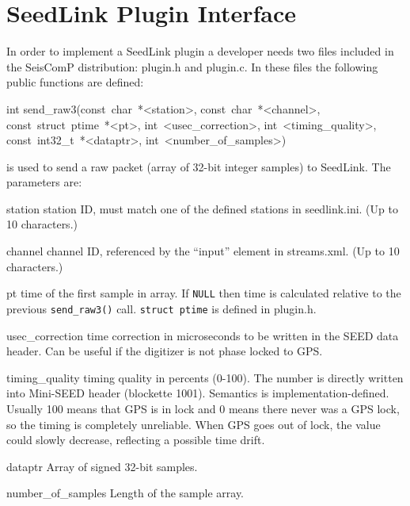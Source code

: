 \documentclass[11pt,a4paper,titlepage]{article}
\begin{document}
\section{SeedLink Plugin Interface}\label{plugins}

\let\stditem\item

In order to implement a SeedLink plugin a developer needs two files
included in the SeisComP distribution: plugin.h and plugin.c. In these
files the following public functions are defined:
\begin{interface}
\item int send_raw3(const~char~*<station>, const~char~*<channel>,
            const~struct~ptime~*<pt>, int~<usec_correction>,
            int~<timing_quality>, const~int32_t~*<dataptr>,
            int~<number_of_samples>)

is used to send a raw packet (array of 32-bit integer samples) to SeedLink.
The parameters are:
\begin{parameters}

\item[station] station ID, must match one of the defined stations in
seedlink.ini. (Up to 10 characters.)

\item[channel] channel ID, referenced by the ``input'' element in
streams.xml. (Up to 10 characters.)

\item[pt] time of the first sample in array. If \verb+NULL+ then time is
calculated relative to the previous \verb+send_raw3()+ call.
\verb+struct ptime+ is defined in plugin.h.

\item[usec_correction] time correction in microseconds to be written in the
SEED data header. Can be useful if the digitizer is not phase locked to
GPS.

\item[timing_quality] timing quality in percents (0-100). The number is
directly written into Mini-SEED header (blockette 1001). Semantics is
implementation-defined. Usually 100 means that GPS is in lock and 0 means
there never was a GPS lock, so the timing is completely unreliable. When
GPS goes out of lock, the value could slowly decrease, reflecting a
possible time drift.

\item[dataptr] Array of signed 32-bit samples.

\item[number_of_samples] Length of the sample array.
\end{parameters}


\end{interface}
\end{document}
